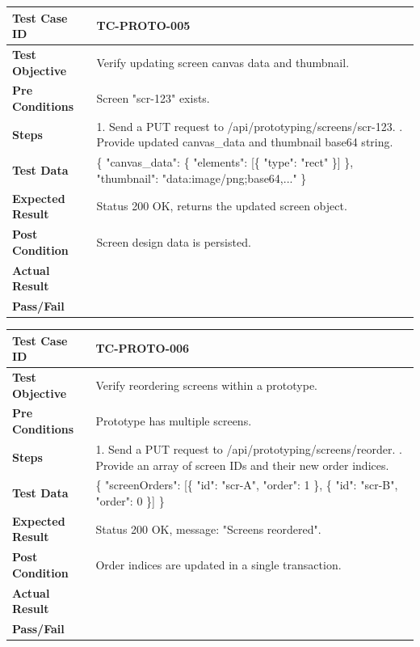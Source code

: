 \begin{longtable}{|p{}|p{}|}
\hline
\textbf{Test Case ID} & TC-PROTO-005 \\ \hline
\textbf{Test Objective} & Verify updating screen canvas data and thumbnail. \\ \hline
\textbf{Pre Conditions} & Screen "scr-123" exists. \\ \hline
\textbf{Steps} & 
1. Send a PUT request to /api/prototyping/screens/scr-123. \newline
2. Provide updated canvas\_data and thumbnail base64 string. \\ \hline
\textbf{Test Data} & \{ "canvas\_data": \{ "elements": [\{ "type": "rect" \}] \}, "thumbnail": "data:image/png;base64,..." \} \\ \hline
\textbf{Expected Result} & Status 200 OK, returns the updated screen object. \\ \hline
\textbf{Post Condition} & Screen design data is persisted. \\ \hline
\textbf{Actual Result} &  \\ \hline
\textbf{Pass/Fail} &  \\ \hline
\end{longtable}

\begin{longtable}{|p{}|p{}|}
\hline
\textbf{Test Case ID} & TC-PROTO-006 \\ \hline
\textbf{Test Objective} & Verify reordering screens within a prototype. \\ \hline
\textbf{Pre Conditions} & Prototype has multiple screens. \\ \hline
\textbf{Steps} & 
1. Send a PUT request to /api/prototyping/screens/reorder. \newline
2. Provide an array of screen IDs and their new order indices. \\ \hline
\textbf{Test Data} & \{ "screenOrders": [\{ "id": "scr-A", "order": 1 \}, \{ "id": "scr-B", "order": 0 \}] \} \\ \hline
\textbf{Expected Result} & Status 200 OK, message: "Screens reordered". \\ \hline
\textbf{Post Condition} & Order indices are updated in a single transaction. \\ \hline
\textbf{Actual Result} &  \\ \hline
\textbf{Pass/Fail} &  \\ \hline
\end{longtable}


